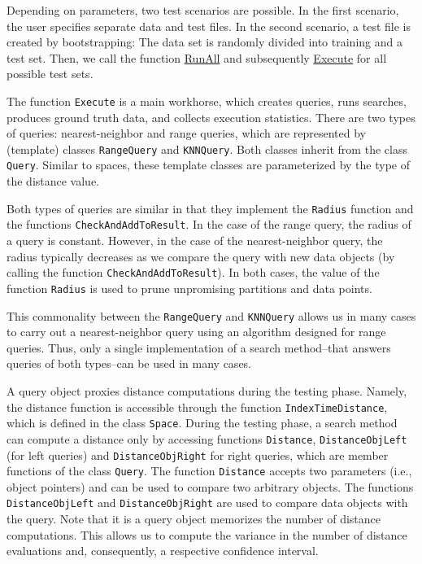 \documentclass[runningheads,a4paper]{llncs}
\newcommand{\ttt}[1]{\texttt{#1}}
\begin{document}
{Depending on parameters, two test scenarios are possible.
In the first scenario, the user specifies separate data and test files.
In the second scenario, a test file is created by bootstrapping:
The data set is randomly divided into training and a test set.
Then,
we call the function \href{https://github.com/searchivarius/NonMetricSpaceLib/blob/master/similarity_search/include/experiments.h#L93}{RunAll} 
and subsequently \href{https://github.com/searchivarius/NonMetricSpaceLib/blob/master/similarity_search/include/experiments.h#L221}{Execute} for all possible test sets.

The function \ttt{Execute} is a main workhorse, which creates queries, runs searches,
produces ground truth data, and collects execution statistics.
There are two types of queries: nearest-neighbor and range queries,
which are represented by (template) classes \ttt{RangeQuery} and \ttt{KNNQuery}.
Both classes inherit from the class \ttt{Query}.
Similar to spaces, these template classes are parameterized by the type of the distance value.

Both types of queries are similar in that they implement the \ttt{Radius} function
and the functions \ttt{CheckAndAddToResult}. 
In the case of the range query, the radius of a query is constant.
However, in the case of the nearest-neighbor query,
the radius typically decreases as we compare the query
with new data objects (by calling the function \ttt{CheckAndAddToResult}).
In both cases, the value of the function \ttt{Radius} is used to prune unpromising
partitions and data points.

This commonality between the \ttt{RangeQuery} and \ttt{KNNQuery}
allows us in many cases to carry out a nearest-neighbor query 
using an algorithm designed for range queries.
Thus, only a single implementation of a search method--that answers queries of both types--can be used in many cases.

A query object proxies distance computations during the testing phase.
Namely, the distance function is accessible through the function
\ttt{IndexTimeDistance}, which is defined in the class \ttt{Space}.
During the testing phase, a search method can compute a distance
only by accessing functions \ttt{Distance}, 
\ttt{DistanceObjLeft} (for left queries) and 
\ttt{DistanceObjRight} for right queries,
which are member functions of the class \ttt{Query}.
The function \ttt{Distance} accepts two parameters (i.e., object pointers) and 
can be used to compare two arbitrary objects.
The functions \ttt{DistanceObjLeft} and \ttt{DistanceObjRight} are used 
to compare data objects with the query.
Note that it is a query object  memorizes the number of distance computations.
This allows us to compute the variance in the number of distance evaluations
and, consequently, a respective confidence interval.



}
\end{document}

